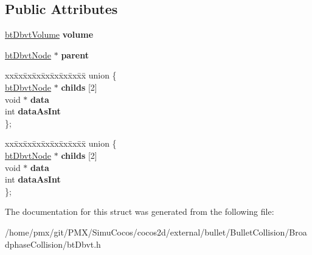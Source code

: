 \subsection*{Public Attributes}
\begin{DoxyCompactItemize}
\item 
\mbox{\label{structbtDbvtNode_a62820bd0549bb1bffaf62850b13ace44}} 
\hyperlink{structbtDbvtAabbMm}{bt\+Dbvt\+Volume} {\bfseries volume}
\item 
\mbox{\label{structbtDbvtNode_a1b23cb05f0b9c73f1c91e7d40a0fd7d3}} 
\hyperlink{structbtDbvtNode}{bt\+Dbvt\+Node} $\ast$ {\bfseries parent}
\item 
\mbox{\label{structbtDbvtNode_a37d2c5ffd968e81e8233c47f682c800c}} 
\begin{tabbing}
xx\=xx\=xx\=xx\=xx\=xx\=xx\=xx\=xx\=\kill
union \{\\
\>\hyperlink{structbtDbvtNode}{btDbvtNode} $\ast$ {\bfseries childs} \mbox{[}2\mbox{]}\\
\>void $\ast$ {\bfseries data}\\
\>int {\bfseries dataAsInt}\\
\}; \\

\end{tabbing}\item 
\mbox{\label{structbtDbvtNode_ae45a99aede7a5c4552f8e3f2bdff334a}} 
\begin{tabbing}
xx\=xx\=xx\=xx\=xx\=xx\=xx\=xx\=xx\=\kill
union \{\\
\>\hyperlink{structbtDbvtNode}{btDbvtNode} $\ast$ {\bfseries childs} \mbox{[}2\mbox{]}\\
\>void $\ast$ {\bfseries data}\\
\>int {\bfseries dataAsInt}\\
\}; \\

\end{tabbing}\end{DoxyCompactItemize}


The documentation for this struct was generated from the following file\+:\begin{DoxyCompactItemize}
\item 
/home/pmx/git/\+P\+M\+X/\+Simu\+Cocos/cocos2d/external/bullet/\+Bullet\+Collision/\+Broadphase\+Collision/bt\+Dbvt.\+h\end{DoxyCompactItemize}
